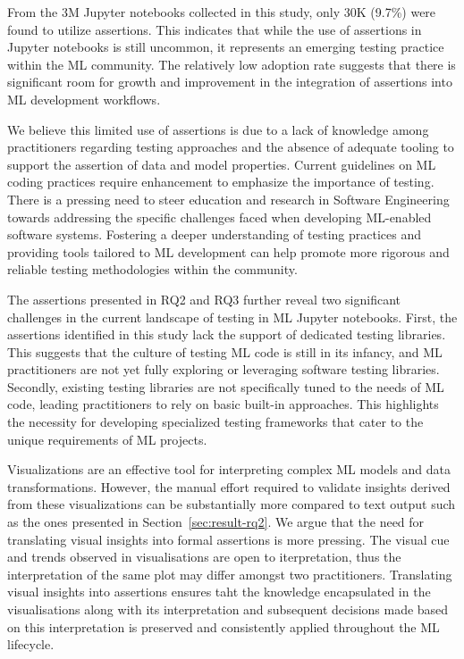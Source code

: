
From the 3M Jupyter notebooks collected in this study, only 30K (9.7\%) were found to utilize assertions. This indicates that while the use of assertions in Jupyter notebooks is still uncommon, it represents an emerging testing practice within the ML community. The relatively low adoption rate suggests that there is significant room for growth and improvement in the integration of assertions into ML development workflows.

We believe this limited use of assertions is due to a lack of knowledge among practitioners regarding testing approaches and the absence of adequate tooling to support the assertion of data and model properties. Current guidelines on ML coding practices require enhancement to emphasize the importance of testing. There is a pressing need to steer education and research in Software Engineering towards addressing the specific challenges faced when developing ML-enabled software systems. Fostering a deeper understanding of testing practices and providing tools tailored to ML development can help promote more rigorous and reliable testing methodologies within the community.

The assertions presented in RQ2 and RQ3 further reveal two significant challenges in the current landscape of testing in ML Jupyter notebooks. First, the assertions identified in this study lack the support of dedicated testing libraries. This suggests that the culture of testing ML code is still in its infancy, and ML practitioners are not yet fully exploring or leveraging software testing libraries. Secondly, existing testing libraries are not specifically tuned to the needs of ML code, leading practitioners to rely on basic built-in approaches. This highlights the necessity for developing specialized testing frameworks that cater to the unique requirements of ML projects.

Visualizations are an effective tool for interpreting complex ML models and data transformations. However, the manual effort required to validate insights derived from these visualizations can be substantially more compared to text output such as the ones presented in Section~\ref{sec:result-rq2}. We argue that the need for translating visual insights into formal assertions is more pressing. The visual cue and trends observed in visualisations are open to iterpretation, thus the interpretation of the same plot may differ amongst two practitioners. Translating visual insights into assertions ensures taht the knowledge encapsulated in the visualisations along with its interpretation and subsequent decisions made based on this interpretation is preserved and consistently applied throughout the ML lifecycle.

